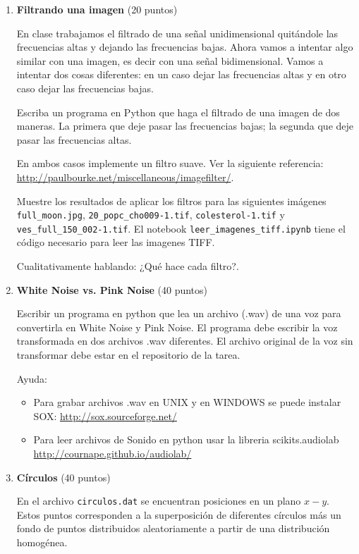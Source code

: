\documentclass{article}
\begin{document}
\begin{enumerate}

\item {\bf Filtrando una imagen} (20 puntos) 

En clase trabajamos el filtrado de una se\~nal unidimensional
quit\'andole las frecuencias altas y dejando las frecuencias
bajas. Ahora vamos a intentar algo similar con una imagen, es decir con
una se\~nal bidimensional. Vamos a intentar dos cosas
diferentes: en un caso dejar las frecuencias altas y en otro caso
dejar las frecuencias bajas.

Escriba un programa en Python que haga el filtrado de una imagen de dos maneras. La primera que deje pasar las frecuencias bajas; la segunda que deje pasar las frecuencias altas. 

En ambos casos implemente un filtro suave. Ver la siguiente
referencia: \url{http://paulbourke.net/miscellaneous/imagefilter/}. 

Muestre los resultados de aplicar los filtros para las siguientes im\'agenes \verb"full_moon.jpg", \verb"20_popc_cho009-1.tif", \verb"colesterol-1.tif" y \verb"ves_full_150_002-1.tif". El notebook \verb"leer_imagenes_tiff.ipynb" tiene el c\'odigo necesario para leer las imagenes TIFF.


Cualitativamente hablando: ¿Qué hace cada filtro?. 


\item {\bf White Noise vs. Pink Noise} (40 puntos)
 
Escribir un programa en python que lea un archivo (.wav) de una
voz para convertirla en White Noise y Pink Noise. El programa debe
escribir la voz transformada en dos archivos .wav diferentes. El
archivo original de la voz sin transformar debe estar en el
repositorio de la tarea.


Ayuda:
\begin{itemize}
\item Para grabar archivos .wav en UNIX y en WINDOWS  se puede
  instalar SOX:
  \url{http://sox.sourceforge.net/}
  
\item 
  Para leer archivos de Sonido en python usar la libreria
  scikits.audiolab
 \url{http://cournape.github.io/audiolab/}
\end{itemize}


\item {\bf C\'irculos} (40 puntos)

En el archivo \verb"circulos.dat" se encuentran posiciones en un plano
$x-y$. Estos puntos corresponden a la superposici\'on de diferentes
c\'irculos m\'as un fondo de puntos distribuidos aleatoriamente a
partir de una distribuci\'on homog\'enea. 


\end{enumerate}
\end{document}
